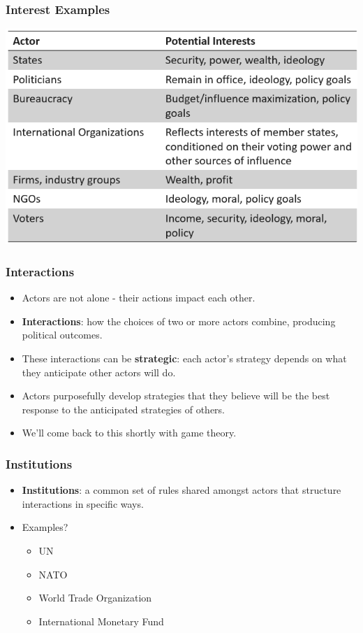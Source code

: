 \documentclass[handout]{beamer}
\begin{document}
\begin{frame} 
	\frametitle{\LARGE{Interest Examples}}
	\centering
	\includegraphics[width=\textwidth,height=0.8\textheight,keepaspectratio]{interests.png}
\end{frame}

\begin{frame} 
	\frametitle{\LARGE{Interactions}}
	\begin{itemize}
		\item Actors are not alone - their actions impact each other.
		\item \textbf{Interactions}: how the choices of two or more actors combine, producing political outcomes. \pause
		\item These interactions can be \textbf{strategic}: each actor's strategy depends on what they anticipate other actors will do. \pause
		\item Actors purposefully develop strategies that they believe will be the best response to the anticipated strategies of others. 
		\item We'll come back to this shortly with game theory.
	\end{itemize}
\end{frame}

\begin{frame} 
	\frametitle{\LARGE{Institutions}}
	\begin{itemize}
		\item \textbf{Institutions}: a common set of rules shared amongst actors that structure interactions in specific ways. \pause
		\item Examples? \pause
		\begin{itemize}
			\item UN
			\item NATO
			\item World Trade Organization
			\item International Monetary Fund
		\end{itemize}
	\end{itemize}
\end{frame}
	
\end{document}
